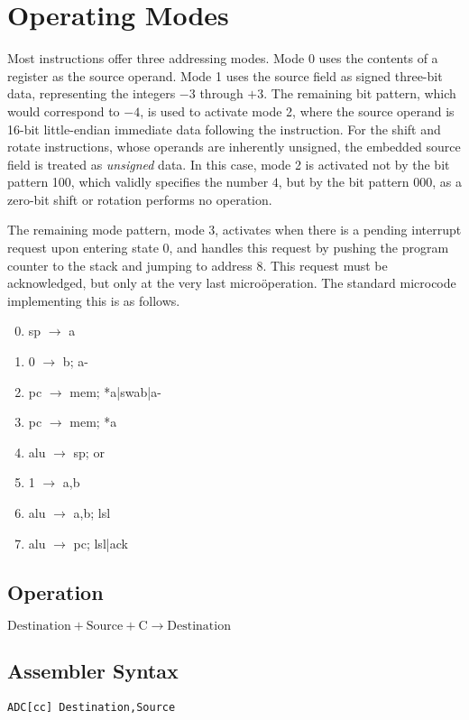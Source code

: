 \documentclass[11pt]{book}
\newcommand*{\instruction}[2][]{%
  \clearpage
  \thispagestyle{fancy}%
  \fancyhf[HL,HR]{\huge{#2}}%
  \fancyhf[HC]{#1}\addtocounter{section}{1}\noindent
}
\begin{document}
\section{Operating Modes}
Most instructions offer three addressing modes.
Mode 0 uses the contents of a register as the source operand.
Mode 1 uses the source field as signed three-bit data,
representing the integers \(-3\) through \(+3\).
The remaining bit pattern, which would correspond to \(-4\),
is used to activate mode 2,
where the source operand is 16-bit little-endian immediate data
following the instruction.
For the shift and rotate instructions,
whose operands are inherently unsigned,
the embedded source field is treated as \emph{unsigned} data.
In this case, mode 2 is activated not by the bit pattern 100,
which validly specifies the number \(4\),
but by the bit pattern 000,
as a zero-bit shift or rotation performs no operation.

The remaining mode pattern, mode 3,
activates when there is a pending interrupt request
upon entering state 0,
and handles this request
by pushing the program counter to the stack
and jumping to address 8.
This request must be acknowledged,
but only at the very last micro\"operation.
The standard microcode implementing this is as follows.

{\ttfamily\selectfont\small
  \begin{enumerate}\setcounter{enumi}{-1}
  \item sp \(\rightarrow\) a
  \item 0 \(\rightarrow\) b; a-
  \item pc \(\rightarrow\) mem; *a|swab|a-
  \item pc \(\rightarrow\) mem; *a
  \item alu \(\rightarrow\) sp; or
  \item 1 \(\rightarrow\) a,b
  \item alu \(\rightarrow\) a,b; lsl
  \item alu \(\rightarrow\) pc; lsl|ack
  \end{enumerate}
}


\instruction[Add With Carry]{ADC}
\subsection*{Operation}
\(\text{Destination}+\text{Source}+\text{C}
\rightarrow\text{Destination}\)

\subsection*{Assembler Syntax}
\texttt{ADC[cc] Destination,Source}
\end{document}
